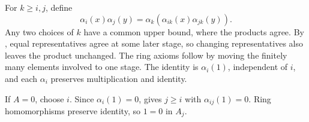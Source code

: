 For $k\geq i,j$, define
\[\alpha_i(x)\alpha_j(y)=\alpha_k(\alpha_{ik}(x)\alpha_{jk}(y)).\]
Any two choices of $k$ have a common upper bound, where the products agree. By , equal representatives agree at some later stage, so changing representatives also leaves the product unchanged. The ring axioms follow by moving the finitely many elements involved to one stage. The identity is $\alpha_i(1)$, independent of $i$, and each $\alpha_i$ preserves multiplication and identity.

If $A=0$, choose $i$. Since $\alpha_i(1)=0$,  gives $j\geq i$ with $\alpha_{ij}(1)=0$. Ring homomorphisms preserve identity, so $1=0$ in $A_j$.
